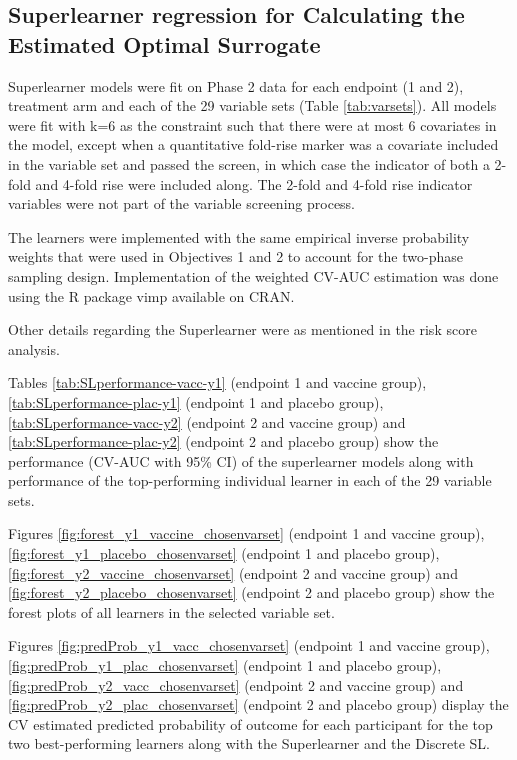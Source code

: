 \documentclass[11pt]{article}
\begin{document}
\clearpage

\hypertarget{superlearner-regression-for-calculating-the-estimated-optimal-surrogate}{%
\subsection{Superlearner regression for Calculating the Estimated Optimal Surrogate}\label{superlearner-regression-for-calculating-the-estimated-optimal-surrogate}}

Superlearner models were fit on Phase 2 data for each endpoint (1 and 2), treatment arm and each of the 29 variable sets (Table \ref{tab:varsets}). All models were fit with k=6 as the constraint such that there were at most 6 covariates in the model, except when a quantitative fold-rise marker was a covariate included in the variable set and passed the screen, in which case the indicator of both a 2-fold and 4-fold rise were included along. The 2-fold and 4-fold rise indicator variables were not part of the variable screening process.

The learners were implemented with the same empirical inverse probability weights that were used in Objectives 1 and 2 to account for the two-phase sampling design. Implementation of the weighted CV-AUC estimation was done using the R package vimp available on CRAN.

Other details regarding the Superlearner were as mentioned in the risk score analysis.

Tables \ref{tab:SLperformance-vacc-y1} (endpoint 1 and vaccine group), \ref{tab:SLperformance-plac-y1} (endpoint 1 and placebo group), \ref{tab:SLperformance-vacc-y2} (endpoint 2 and vaccine group) and \ref{tab:SLperformance-plac-y2} (endpoint 2 and placebo group) show the performance (CV-AUC with 95\% CI) of the superlearner models along with performance of the top-performing individual learner in each of the 29 variable sets.

Figures \ref{fig:forest_y1_vaccine_chosenvarset} (endpoint 1 and vaccine group), \ref{fig:forest_y1_placebo_chosenvarset} (endpoint 1 and placebo group), \ref{fig:forest_y2_vaccine_chosenvarset} (endpoint 2 and vaccine group) and \ref{fig:forest_y2_placebo_chosenvarset} (endpoint 2 and placebo group) show the forest plots of all learners in the selected variable set.

Figures \ref{fig:predProb_y1_vacc_chosenvarset} (endpoint 1 and vaccine group), \ref{fig:predProb_y1_plac_chosenvarset} (endpoint 1 and placebo group), \ref{fig:predProb_y2_vacc_chosenvarset} (endpoint 2 and vaccine group) and \ref{fig:predProb_y2_plac_chosenvarset} (endpoint 2 and placebo group) display the CV estimated predicted probability of outcome for each participant for the top two best-performing learners along with the Superlearner and the Discrete SL.
\end{document}
